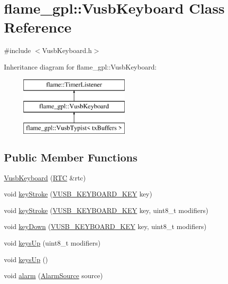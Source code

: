 \hypertarget{classflame__gpl_1_1_vusb_keyboard}{\section{flame\-\_\-gpl\-:\-:Vusb\-Keyboard Class Reference}
\label{classflame__gpl_1_1_vusb_keyboard}
}


{\ttfamily \#include $<$Vusb\-Keyboard.\-h$>$}

Inheritance diagram for flame\-\_\-gpl\-:\-:Vusb\-Keyboard\-:\begin{figure}[H]
\begin{center}
\leavevmode
\includegraphics[height=3.000000cm]{classflame__gpl_1_1_vusb_keyboard}
\end{center}
\end{figure}
\subsection*{Public Member Functions}
\begin{DoxyCompactItemize}
\item 
\hyperlink{classflame__gpl_1_1_vusb_keyboard_a6b4cf0b12233b993265132d7f0b9319e}{Vusb\-Keyboard} (\hyperlink{classflame_1_1_r_t_c}{R\-T\-C} \&rtc)
\item 
void \hyperlink{classflame__gpl_1_1_vusb_keyboard_a099ca27a1d4477793a37a14dba667d03}{key\-Stroke} (\hyperlink{namespaceflame__gpl_a40752e4f9e83da1573a3d418e0bd5653}{V\-U\-S\-B\-\_\-\-K\-E\-Y\-B\-O\-A\-R\-D\-\_\-\-K\-E\-Y} key)
\item 
void \hyperlink{classflame__gpl_1_1_vusb_keyboard_afb0d91292961af19582fe9a2f904d694}{key\-Stroke} (\hyperlink{namespaceflame__gpl_a40752e4f9e83da1573a3d418e0bd5653}{V\-U\-S\-B\-\_\-\-K\-E\-Y\-B\-O\-A\-R\-D\-\_\-\-K\-E\-Y} key, uint8\-\_\-t modifiers)
\item 
void \hyperlink{classflame__gpl_1_1_vusb_keyboard_a09736fc4b6a7a17d8b986c3e2d0d47c7}{key\-Down} (\hyperlink{namespaceflame__gpl_a40752e4f9e83da1573a3d418e0bd5653}{V\-U\-S\-B\-\_\-\-K\-E\-Y\-B\-O\-A\-R\-D\-\_\-\-K\-E\-Y} key, uint8\-\_\-t modifiers)
\item 
void \hyperlink{classflame__gpl_1_1_vusb_keyboard_a4da937d6fe26a4722bb1f58e293d3c04}{keys\-Up} (uint8\-\_\-t modifiers)
\item 
void \hyperlink{classflame__gpl_1_1_vusb_keyboard_a2c25628b812dbfe484ba1eff1eb8dc37}{keys\-Up} ()
\item 
void \hyperlink{classflame__gpl_1_1_vusb_keyboard_ac78516dbc8ac2519bf2f0b4327c13b4d}{alarm} (\hyperlink{namespaceflame_a6d176ba245556716fd3e32006bb7cfe5}{Alarm\-Source} source)
\end{DoxyCompactItemize}
